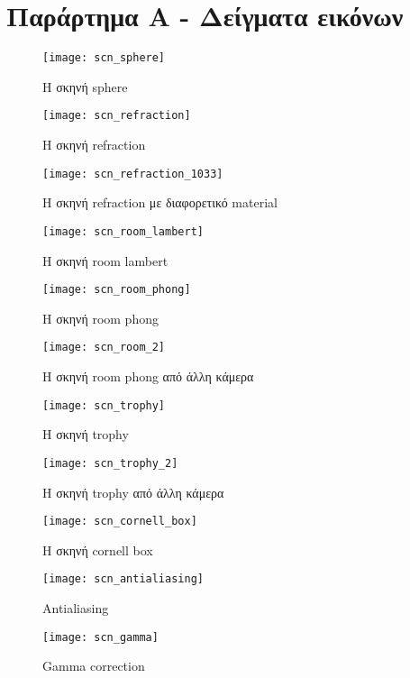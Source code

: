 \chapter{Παράρτημα Α - Δείγματα εικόνων}

\graphicspath{{appendix1/fig/}}

\begin{figure} 
\centering 
\texttt{[image: scn\_sphere]}
\caption{H σκηνή sphere}
\end{figure}

\begin{figure} 
\centering 
\texttt{[image: scn\_refraction]}
\caption{H σκηνή refraction}
\end{figure}

\begin{figure} 
\centering 
\texttt{[image: scn\_refraction\_1033]}
\caption{H σκηνή refraction με διαφορετικό material}
\end{figure}

\begin{figure} 
\centering 
\texttt{[image: scn\_room\_lambert]}
\caption{H σκηνή room lambert}
\end{figure}

\begin{figure} 
\centering 
\texttt{[image: scn\_room\_phong]}
\caption{H σκηνή room phong}
\end{figure}

\begin{figure} 
\centering 
\texttt{[image: scn\_room\_2]}
\caption{H σκηνή room phong από άλλη κάμερα}
\end{figure}

\begin{figure} 
\centering 
\texttt{[image: scn\_trophy]}
\caption{H σκηνή trophy}
\end{figure}

\begin{figure} 
\centering 
\texttt{[image: scn\_trophy\_2]}
\caption{H σκηνή trophy από άλλη κάμερα}
\end{figure}

\begin{figure} 
\centering 
\texttt{[image: scn\_cornell\_box]}
\caption{H σκηνή cornell box}
\end{figure}

\begin{figure} 
\centering 
\texttt{[image: scn\_antialiasing]}
\caption{Antialiasing}
\end{figure}

\begin{figure} 
\centering 
\texttt{[image: scn\_gamma]}
\caption{Gamma correction}
\end{figure}

